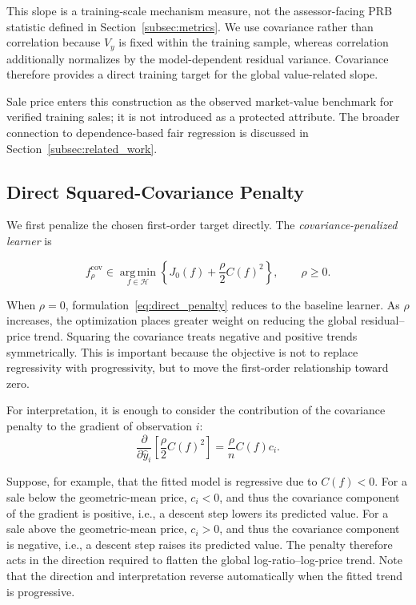 \documentclass[10pt]{article}
\theoremstyle{definition}
\newcommand{\1}{\mathbf{1}}
\newcommand{\Hcal}{\mathcal{H}}
\newcommand{\argminop}{\operatorname*{arg\,min}}
\begin{document}
{This slope is a training-scale mechanism measure, not the assessor-facing PRB statistic defined in Section~\ref{subsec:metrics}. We use covariance rather than correlation because $V_y$ is fixed within the training sample, whereas correlation additionally normalizes by the model-dependent residual variance. Covariance therefore provides a direct training target for the global value-related slope.}

{Sale price enters this construction as the observed market-value benchmark for verified training sales; it is not introduced as a protected attribute. The broader connection to dependence-based fair regression is discussed in Section~\ref{subsec:related_work}.}


\subsection{{Direct Squared-Covariance Penalty}}
\label{subsec:direct_penalty}

{We first penalize the chosen first-order target directly. The \emph{covariance-penalized learner} is}


{
\begin{equation}
\label{eq:direct_penalty}
f_\rho^{\mathrm{cov}}
\in
\argminop_{f\in\Hcal}
\left\{
J_0(f)+\frac{\rho}{2}C(f)^2
\right\},
\qquad
\rho\geq 0.
\end{equation}
}

When $\rho=0$, formulation~\eqref{eq:direct_penalty} reduces to the baseline learner. As $\rho$ increases, the optimization places greater weight on reducing the global residual--price trend. Squaring the covariance treats negative and positive trends symmetrically. This is important because the objective is not to replace regressivity with progressivity, but to move the first-order relationship toward zero.


{For interpretation, it is enough to consider the contribution of the covariance penalty to the gradient of observation $i$:}
{
\begin{equation}
\label{eq:direct_penalty_gradient}
\frac{\partial}{\partial \widehat y_i}
\left[
\frac{\rho}{2}C(f)^2
\right]
=
\frac{\rho}{n}C(f)c_i.
\end{equation}
}


{Suppose, for example, that the fitted model is regressive due to $C(f)<0$. For a sale below the geometric-mean price, $c_i<0$, and thus the covariance component of the gradient is positive, i.e., a descent step lowers its predicted value. For a sale above the geometric-mean price, $c_i>0$, and thus the covariance component is negative, i.e., a descent step raises its predicted value. The penalty therefore acts in the direction required to flatten the global log-ratio--log-price trend. Note that the direction and interpretation reverse automatically when the fitted trend is progressive.}
\end{document}
